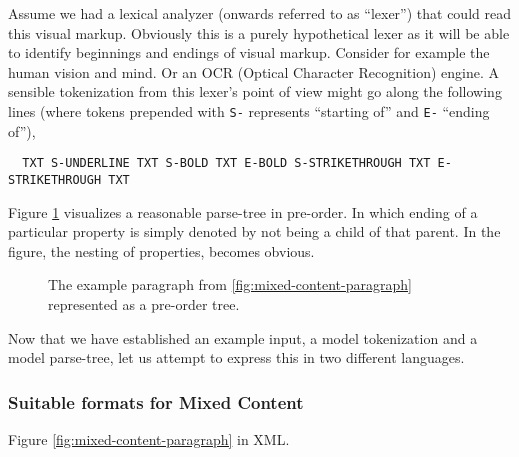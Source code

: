 \documentclass{scrreprt}
\begin{document}
Assume we had a lexical analyzer (onwards referred to as ``lexer'') that could read this visual markup. Obviously this is a purely hypothetical lexer as it will be able to identify beginnings and endings of visual markup. Consider for example the human vision and mind. Or an OCR (Optical Character Recognition) engine. A sensible tokenization from this lexer's point of view might go along the following lines (where tokens prepended with \texttt{S-} represents ``starting of'' and \texttt{E-} ``ending of''),




\begin{lstlisting}
  TXT S-UNDERLINE TXT S-BOLD TXT E-BOLD S-STRIKETHROUGH TXT E-STRIKETHROUGH TXT
\end{lstlisting}



Figure \ref{fig:mixed-content-tree} visualizes a reasonable parse-tree in pre-order. In which ending of a particular property is simply denoted by not being a child of that parent. In the figure, the nesting of properties, becomes obvious.
  



\begin{figure}[h]
  \centering

  \caption{The example paragraph from \ref{fig:mixed-content-paragraph} represented as a pre-order tree.}
  \label{fig:mixed-content-tree}
\end{figure}



Now that we have established an example input, a model tokenization and a model parse-tree, let us attempt to express this in two different languages.



\subsubsection{Suitable formats for Mixed Content}
Figure \ref{fig:mixed-content-paragraph} in XML.
\end{document}
